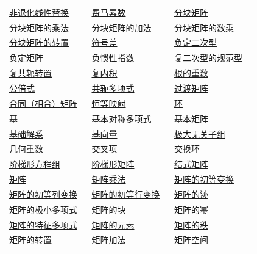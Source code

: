 \begin{longtable}{@{}>{\raggedright\arraybackslash}p{0.31\linewidth}>{\raggedright\arraybackslash}p{0.31\linewidth}>{\raggedright\arraybackslash}p{0.31\linewidth}@{}}
\hyperref[p1:concept:c7-l1164]{非退化线性替换} & \hyperref[p1:concept:c1-l2000]{费马素数} & \hyperref[p1:concept:c3-l1322]{分块矩阵}\\
\hyperref[p1:concept:c3-l1440]{分块矩阵的乘法} & \hyperref[p1:concept:c3-l1440]{分块矩阵的加法} & \hyperref[p1:concept:c3-l1440]{分块矩阵的数乘}\\
\hyperref[p1:concept:c3-l1440]{分块矩阵的转置} & \hyperref[p1:concept:c7-l1527]{符号差} & \hyperref[p1:concept:c7-l1931]{负定二次型}\\
\hyperref[p1:concept:c7-l1931]{负定矩阵} & \hyperref[p1:concept:c7-l1527]{负惯性指数} & \hyperref[p1:concept:c7-l1425]{复二次型的规范型}\\
\hyperref[p1:concept:c3-l683]{复共轭转置} & \hyperref[p1:concept:c6-l2464]{复内积} & \hyperref[p1:concept:c1-l1024]{根的重数}\\
\hyperref[p1:concept:c1-l2164]{公倍式} & \hyperref[p1:concept:c1-l2305]{共轭多项式} & \hyperref[p1:concept:c4-l519]{过渡矩阵}\\
\hyperref[p1:concept:c6-l669]{合同（相合）矩阵} & \hyperref[p1:concept:c3-l363]{恒等映射} & \hyperref[p1:concept:c1-l7]{环}\\
\hyperref[p1:concept:c4-l227]{基} & \hyperref[p1:concept:c1-l1493]{基本对称多项式} & \hyperref[p1:concept:c3-l660]{基本矩阵}\\
\hyperref[p1:concept:c2-l1151]{基础解系} & \hyperref[p1:concept:c4-l227]{基向量} & \hyperref[p1:concept:c2-l548]{极大无关子组}\\
\hyperref[p1:concept:c5-l171]{几何重数} & \hyperref[p1:concept:c7-l1027]{交叉项} & \hyperref[p1:concept:c1-l7]{交换环}\\
\hyperref[p1:concept:c2-l61]{阶梯形方程组} & \hyperref[p1:concept:c2-l747]{阶梯形矩阵} & \hyperref[p1:concept:c3-l3286]{结式矩阵}\\
\hyperref[p1:concept:c2-l654]{矩阵} & \hyperref[p1:concept:c3-l504]{矩阵乘法} & \hyperref[p1:concept:c2-l857]{矩阵的初等变换}\\
\hyperref[p1:concept:c2-l857]{矩阵的初等列变换} & \hyperref[p1:concept:c2-l857]{矩阵的初等行变换} & \hyperref[p1:concept:c3-l826]{矩阵的迹}\\
\hyperref[p1:concept:c3-l787]{矩阵的极小多项式} & \hyperref[p1:concept:c3-l1322]{矩阵的块} & \hyperref[p1:concept:c3-l717]{矩阵的幂}\\
\hyperref[p1:concept:c3-l1987]{矩阵的特征多项式} & \hyperref[p1:concept:c2-l654]{矩阵的元素} & \hyperref[p1:concept:c2-l904]{矩阵的秩}\\
\hyperref[p1:concept:c3-l683]{矩阵的转置} & \hyperref[p1:concept:c3-l395]{矩阵加法} & \hyperref[p1:concept:c2-l654]{矩阵空间}\\

\end{longtable}
